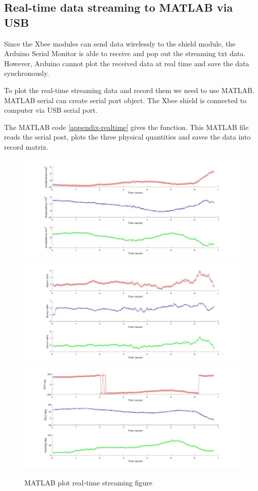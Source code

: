 \subsection{Real-time data streaming to MATLAB via USB}
Since the Xbee modules can send data wirelessly to the shield module, the Arduino Serial Monitor is able to receive and pop out the streaming txt data. However, Arduino cannot plot the received data at real time and save the data synchronously.

To plot the real-time streaming data and record them we need to use MATLAB. MATLAB serial can create serial port object. The Xbee shield is connected to computer via USB serial port.

The MATLAB code \ref{appendix-realtime} gives the function. This MATLAB file reads the serial post, plots the three physical quantities and saves the data into record matrix.       

\begin{figure}[ht]
\centering
\includegraphics[width=\textwidth]{fig/DOE/acceleration}
\includegraphics[width=\textwidth]{fig/DOE/gyro}
\includegraphics[width=\textwidth]{fig/DOE/orientation}
\caption{MATLAB plot real-time streaming figure}
\end{figure}

